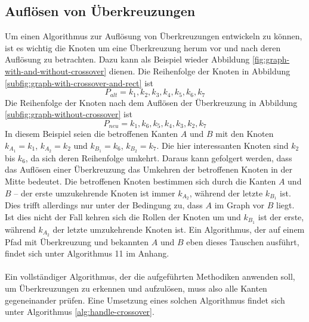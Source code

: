 \subsection{Auflösen von Überkreuzungen}

Um einen Algorithmus zur Auflösung von Überkreuzungen entwickeln zu können, ist es wichtig die Knoten um eine Überkreuzung herum vor und nach deren Auflösung zu betrachten.
Dazu kann als Beispiel wieder Abbildung \vref{fig:graph-with-and-without-crossover} dienen.
Die Reihenfolge der Knoten in Abbildung \vref{subfig:graph-with-crossover-and-rect} ist $$P_{alt} = k_1, k_2, k_3, k_4, k_5, k_6, k_7$$
Die Reihenfolge der Knoten nach dem Auflösen der Überkreuzung in Abbildung \vref{subfig:graph-without-crossover} ist $$P_{neu} = k_1, k_6, k_5, k_4, k_3, k_2, k_7$$
In diesem Beispiel seien die betroffenen Kanten $A$ und $B$ mit den Knoten $k_{A_1} = k_1$, $k_{A_2} = k_2$ und $k_{B_1} = k_6$, $k_{B_2} = k_7$.
Die hier interessanten Knoten sind $k_2$ bis $k_6$, da sich deren Reihenfolge umkehrt.
Daraus kann gefolgert werden, dass das Auflösen einer Überkreuzung das Umkehren der betroffenen Knoten in der Mitte bedeutet.
Die betroffenen Knoten bestimmen sich durch die Kanten $A$ und $B$ -- der erste umzukehrende Knoten ist immer $k_{A_2}$, während der letzte $k_{B_1}$ ist.
Dies trifft allerdings nur unter der Bedingung zu, dass $A$ im Graph vor $B$ liegt.
Ist dies nicht der Fall kehren sich die Rollen der Knoten um und $k_{B_1}$ ist der erste, während $k_{A_2}$ der letzte umzukehrende Knoten ist.
Ein Algorithmus, der auf einem Pfad mit Überkreuzung und bekannten $A$ und $B$ eben dieses Tauschen ausführt, findet sich unter Algorithmus 11 im Anhang. %
\\\\
Ein vollständiger Algorithmus, der die aufgeführten Methodiken anwenden soll, um Überkreuzungen zu erkennen und aufzulösen, muss also alle Kanten gegeneinander prüfen.
Eine Umsetzung eines solchen Algorithmus findet sich unter Algorithmus \vref{alg:handle-crossover}.
